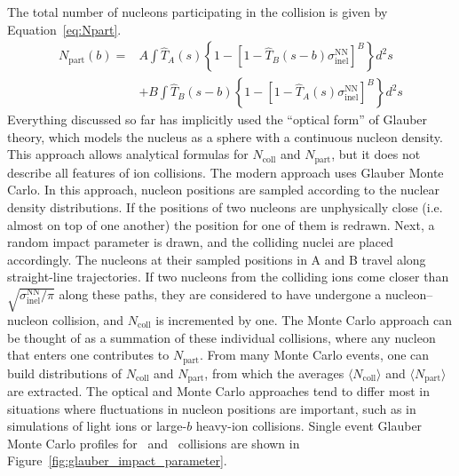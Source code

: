 The total number of nucleons participating in the collision is given by Equation~\ref{eq:Npart}.
\begin{equation}
    \label{eq:Npart}
    \begin{aligned}
        N_{\mathrm{part}}(b) ={}& A \int \hat{T}_A(s)\left\{1-\left[1-\hat{T}_B(s-b)\sigma^{\mathrm{NN}}_\mathrm{inel}\right]^{B}\right\}d^2s \\
        &+ B \int \hat{T}_B(s-b)\left\{1-\left[1-\hat{T}_A(s)\sigma^{\mathrm{NN}}_\mathrm{inel}\right]^{B}\right\}d^2s
    \end{aligned}
\end{equation}
Everything discussed so far has implicitly used the ``optical form'' of Glauber theory, which models the nucleus as a sphere with a continuous nucleon density.
This approach allows analytical formulas for $N_{\mathrm{coll}}$ and $N_{\mathrm{part}}$, but it does not describe all features of ion collisions.
The modern approach uses Glauber Monte Carlo.
In this approach, nucleon positions are sampled according to the nuclear density distributions.
If the positions of two nucleons are unphysically close (i.e. almost on top of one another) the position for one of them is redrawn.
Next, a random impact parameter is drawn, and the colliding nuclei are placed accordingly.
The nucleons at their sampled positions in A and B travel along straight-line trajectories.
If two nucleons from the colliding ions come closer than $\sqrt{\sigma^{\mathrm{NN}}_\mathrm{inel}/\pi}$ along these paths, they are considered to have undergone a nucleon--nucleon collision, and $N_{\mathrm{coll}}$ is incremented by one.
The Monte Carlo approach can be thought of as a summation of these individual collisions, where any nucleon that enters one contributes to $N_{\mathrm{part}}$.
From many Monte Carlo events, one can build distributions of $N_{\mathrm{coll}}$ and $N_{\mathrm{part}}$, from which the averages $\langle N_{\mathrm{coll}} \rangle$ and $\langle N_{\mathrm{part}} \rangle$ are extracted.
The optical and Monte Carlo approaches tend to differ most in situations where fluctuations in nucleon positions are important, such as in simulations of light ions or large-$b$ heavy-ion collisions.
Single event Glauber Monte Carlo profiles for \OxO\ and \PbxPb\ collisions are shown in Figure~\ref{fig:glauber_impact_parameter}.

